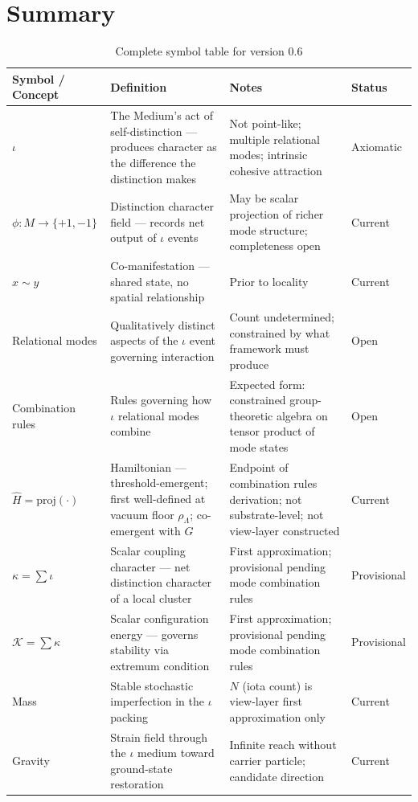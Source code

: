 \documentclass[11pt,letterpaper]{article}
\newcommand{\Kappa}{\mathcal{K}}
\begin{document}
\section{Summary}
\label{sec:org4ba63cb}

\begin{table}[htbp]
\caption{Complete symbol table for version 0.6}
\centering
\begin{tabular}{llp{4.5cm}l}
\toprule
\textbf{Symbol / Concept} & \textbf{Definition} & \textbf{Notes} & \textbf{Status}\\[0pt]
\midrule
\(\iota\) & The Medium's act of self-distinction --- produces character as the difference the distinction makes & Not point-like; multiple relational modes; intrinsic cohesive attraction & Axiomatic\\[0pt]
\(\phi : M \to \{+1,-1\}\) & Distinction character field --- records net output of \(\iota\) events & May be scalar projection of richer mode structure; completeness open & Current\\[0pt]
\(x \sim y\) & Co-manifestation --- shared state, no spatial relationship & Prior to locality & Current\\[0pt]
Relational modes & Qualitatively distinct aspects of the \(\iota\) event governing interaction & Count undetermined; constrained by what framework must produce & Open\\[0pt]
Combination rules & Rules governing how \(\iota\) relational modes combine & Expected form: constrained group-theoretic algebra on tensor product of mode states & Open\\[0pt]
\(\hat{H} = \mathrm{proj}(\cdot)\) & Hamiltonian --- threshold-emergent; first well-defined at vacuum floor \(\rho_\Lambda\); co-emergent with \(G\) & Endpoint of combination rules derivation; not substrate-level; not view-layer constructed & Current\\[0pt]
\(\kappa = \sum \iota\) & Scalar coupling character --- net distinction character of a local cluster & First approximation; provisional pending mode combination rules & Provisional\\[0pt]
\(\Kappa = \sum \kappa\) & Scalar configuration energy --- governs stability via extremum condition & First approximation; provisional pending mode combination rules & Provisional\\[0pt]
Mass & Stable stochastic imperfection in the \(\iota\) packing & \(N\) (iota count) is view-layer first approximation only & Current\\[0pt]
Gravity & Strain field through the \(\iota\) medium toward ground-state restoration & Infinite reach without carrier particle; candidate direction & Current\\[0pt]

\end{tabular}
\end{table}
\end{document}

